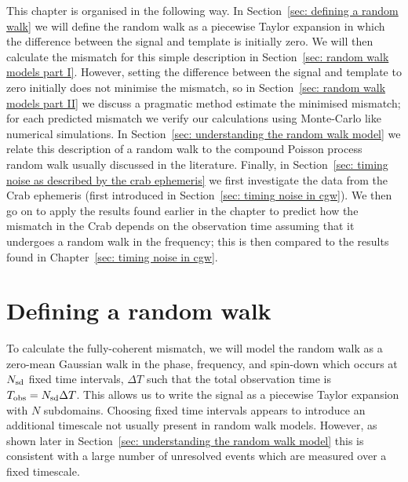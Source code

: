 \documentclass[../full_thesis/full_thesis.tex]{subfiles}
\begin{document}
{This chapter is organised in the following way. In Section~\ref{sec: defining a
random walk} we will define the random walk as a piecewise Taylor expansion in
which the difference between the signal and template is initially zero. We will
then calculate the mismatch for this simple description in Section~\ref{sec:
random walk models part I}. However, setting the difference between the signal
and template to zero initially does not minimise the mismatch, so in
Section~\ref{sec: random walk models part II} we discuss a pragmatic method
estimate the minimised mismatch; for each predicted mismatch we verify our
calculations using Monte-Carlo like numerical simulations. In Section~\ref{sec:
understanding the random walk model} we relate this description of a random
walk to the compound Poisson process random walk usually discussed in the
literature.  Finally, in Section~\ref{sec: timing noise as described by the
crab ephemeris} we first investigate the data from the Crab ephemeris (first
introduced in Section~\ref{sec: timing noise in cgw}). We then go on to apply the
results found earlier in the chapter to predict how the mismatch in the Crab
depends on the observation time assuming that it undergoes a random walk in the
frequency; this is then compared to the results found in Chapter~\ref{sec:
timing noise in cgw}.

}

\section{Defining a random walk}
\label{sec: defining a random walk}
To calculate the fully-coherent mismatch, we will model the random walk as a
zero-mean Gaussian walk in the phase, frequency, and spin-down which occurs at
$N_{\textrm{sd}}$ fixed time intervals, $\Delta T$ such that the total observation time is
$T_{\mathrm{obs}} = N_{\textrm{sd}} \Delta T$.
This allows us to write the signal as 
a piecewise Taylor expansion with $N$ subdomains. Choosing fixed time intervals appears to
introduce an additional timescale not usually present in random walk models.
However, as shown later in Section~\ref{sec: understanding the random walk model} this is consistent with a
large number of unresolved events which
are measured over a fixed timescale.
\end{document}
